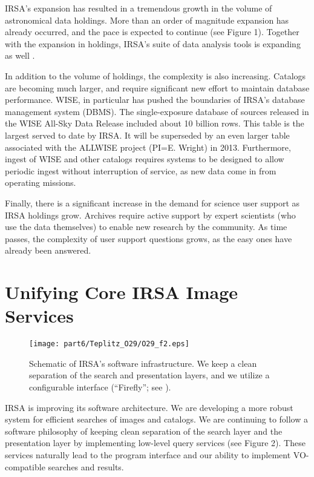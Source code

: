 IRSA's expansion has resulted in a tremendous growth in the volume of astronomical data holdings.  More than an order of magnitude expansion has already occurred, and the pace is expected to continue (see Figure 1).  Together with the expansion in holdings, IRSA's suite of data analysis tools is expanding as well \citep{teplitz12}.

In addition to the volume of holdings, the complexity is also increasing.  Catalogs are becoming much larger, and require significant new effort to maintain database performance.  WISE, in particular has pushed the boundaries of IRSA's database management system (DBMS).  The single-exposure database of sources released in the WISE All-Sky Data Release included about 10 billion rows.  This table is the largest served to date by IRSA. It will be superseded by an even larger table associated with the ALLWISE project (PI=E. Wright) in 2013.  Furthermore, ingest of WISE and other catalogs requires systems to be designed to allow periodic ingest without interruption of service, as new data come in from operating missions.  

Finally, there is a significant increase in the demand for science user support as IRSA holdings grow.  Archives require active support by expert scientists (who use the data themselves) to enable new research by the community.  As time passes, the complexity of user support questions grows, as the easy ones have already been answered.


\section{Unifying Core IRSA Image Services}

\begin{figure}[t]

\centering
\texttt{[image: part6/Teplitz\_O29/O29\_f2.eps]}
\caption{Schematic of IRSA's software infrastructure. We keep a clean separation of the search and presentation layers, and we utilize a configurable interface (``Firefly''; see \citet{roby_XXII}).}

\end{figure}

IRSA is improving its software architecture. We are developing a more robust system for efficient searches of images and catalogs. We are continuing to follow a software philosophy of keeping clean separation of the search layer and the presentation layer by implementing low-level query services (see Figure 2). These services naturally lead to the program interface and our ability to implement VO-compatible searches and results.


